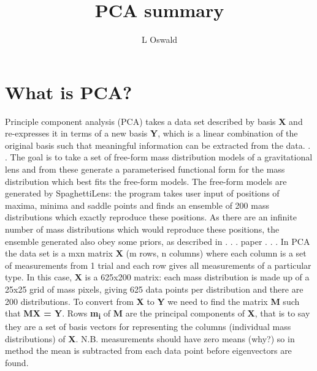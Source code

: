 \documentclass{article}
\begin{document}
\title{PCA summary}
\author{L Oswald}
\date{}

\maketitle



\section{What is PCA?}

Principle component analysis (PCA) takes a data set described by basis \textbf{X} and re-expresses it in terms of a new basis \textbf{Y}, which is a linear combination of the original basis such that meaningful information can be extracted from the data. . .
The goal is to take a set of free-form mass distribution models of a gravitational lens and from these generate a parameterised functional form for the mass distribution which best fits the free-form models.
The free-form models are generated by SpaghettiLens: the program takes user input of positions of maxima, minima and saddle points and finds an ensemble of 200 mass distributions which exactly reproduce these positions. As there are an infinite number of mass distributions which would reproduce these positions, the ensemble generated also obey some priors, as described in . . . paper . . .
In PCA the data set is a mxn matrix \textbf{X} (m rows, n columns) where each column is a set of measurements from 1 trial and each row gives all measurements of a particular type. In this case, \textbf{X} is a 625x200 matrix: each mass distribution is made up of a 25x25 grid of mass pixels, giving 625 data points per distribution and there are 200 distributions.
To convert from \textbf{X} to \textbf{Y} we need to find the matrix \textbf{M} such that \textbf{MX = Y}. Rows \textbf{m\textsubscript{i}} of \textbf{M} are the principal components of \textbf{X}, that is to say they are a set of basis vectors for representing the columns (individual mass distributions) of \textbf{X}.
N.B. measurements should have zero means (why?) so in method the mean is subtracted from each data point before eigenvectors are found.
\end{document}
